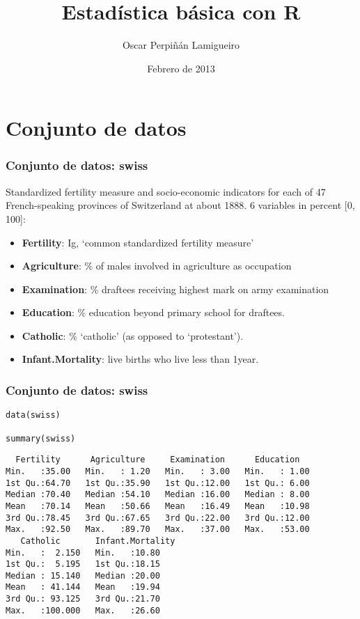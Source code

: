\documentclass{beamer}
\title{Estadística básica con R}
\author{Oscar Perpiñán Lamigueiro}
\date{Febrero de 2013}
\begin{document}
\maketitle




\section{Conjunto de datos}
\label{sec-1}
\begin{frame}
\frametitle{Conjunto de datos: swiss}
\label{sec-1-1}

Standardized fertility measure and socio-economic indicators for
each of 47 French-speaking provinces of Switzerland at
about 1888. 6 variables in percent [0, 100]:

\begin{itemize}
\item \textbf{Fertility}:         Ig, ‘common standardized fertility measure’
\item \textbf{Agriculture}:       \% of males involved in agriculture as occupation
\item \textbf{Examination}:       \% draftees receiving highest mark on army examination
\item \textbf{Education}:         \% education beyond primary school for draftees.
\item \textbf{Catholic}:          \% ‘catholic’ (as opposed to ‘protestant’).
\item \textbf{Infant.Mortality}:  live births who live less than 1year.
\end{itemize}
      
\end{frame}
\begin{frame}[fragile]
\frametitle{Conjunto de datos: swiss}
\label{sec-1-2}



\lstset{language=R}
\begin{lstlisting}
data(swiss)

summary(swiss)
\end{lstlisting}


\begin{verbatim}
  Fertility      Agriculture     Examination      Education    
Min.   :35.00   Min.   : 1.20   Min.   : 3.00   Min.   : 1.00  
1st Qu.:64.70   1st Qu.:35.90   1st Qu.:12.00   1st Qu.: 6.00  
Median :70.40   Median :54.10   Median :16.00   Median : 8.00  
Mean   :70.14   Mean   :50.66   Mean   :16.49   Mean   :10.98  
3rd Qu.:78.45   3rd Qu.:67.65   3rd Qu.:22.00   3rd Qu.:12.00  
Max.   :92.50   Max.   :89.70   Max.   :37.00   Max.   :53.00  
   Catholic       Infant.Mortality
Min.   :  2.150   Min.   :10.80   
1st Qu.:  5.195   1st Qu.:18.15   
Median : 15.140   Median :20.00   
Mean   : 41.144   Mean   :19.94   
3rd Qu.: 93.125   3rd Qu.:21.70   
Max.   :100.000   Max.   :26.60
\end{verbatim}
\end{frame}
\end{document}
